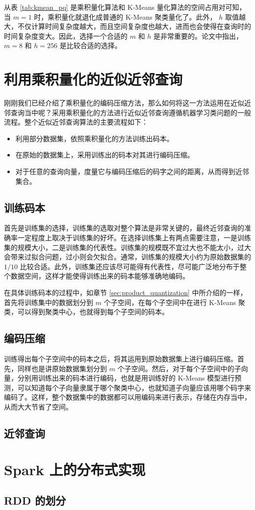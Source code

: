 从表 \ref{tab:kmean_pq} 是乘积量化算法和 K-Means 量化算法的空间占用对可知，当 $m = 1$ 时，乘积量化就退化成普通的 K-Means 聚类量化了。此外， $h$ 取值越大，不仅计算时间复杂度越大，而且空间复杂度也越大，进而也会使得在查询时的时间复杂度变大。因此，选择一个合适的 $m$ 和 $h$ 是非常重要的。论文\cite{Herve_PQ}中指出，$ m = 8 $ 和 $h = 256$ 是比较合适的选择。
\section{利用乘积量化的近似近邻查询}
刚刚我们已经介绍了乘积量化的编码压缩方法，那么如何将这一方法运用在近似近邻查询当中呢？采用乘积量化的方法进行近似近邻查询遵循机器学习类问题的一般流程。整个近似近邻查询算法的主要流程如下：
\begin{itemize}
\item 利用部分数据集，依照乘积量化的方法训练出码本。
\item 在原始的数据集上，采用训练出的码本对其进行编码压缩。
\item 对于任意的查询向量，度量它与编码压缩后的码字之间的距离，从而得到近邻集合。
\end{itemize}
\subsection{训练码本}
首先是训练集的选择，训练集的选取对整个算法是非常关键的，最终近邻查询的准确率一定程度上取决于训练集的好坏。在选择训练集上有两点需要注意，一是训练集的规模大小，二是训练集的代表性。训练集的规模既不宜过大也不能太小，过大会带来过拟合问题，过小则会欠拟合。通常，训练集的规模大小约为原始数据集的 $1/10$ 比较合适。此外，训练集还应该尽可能得有代表性，尽可能广泛地分布于整个数据空间，这样才能使得训练出来的码本能够准确地编码。

在具体训练码本的过程中，如章节 \ref{sec:product_quantization} 中所介绍的一样，首先将训练集中的数据划分到 $m$ 个子空间，在每个子空间中在进行 K-Means 聚类，可以得到聚类中心，也就得到每个子空间的码本。
\subsection{编码压缩}
训练得出每个子空间中的码本之后，将其运用到原始数据集上进行编码压缩。首先，同样也是讲原始数据集划分到 $m$ 个子空间。然后，对于每个子空间中的子向量，分别用训练出来的码本进行编码，也就是用训练好的 K-Means 模型进行预测，可以知道每个子向量隶属于哪个聚类中心，也就知道子向量应该用哪个码字来编码了。这样，整个数据集中的数据都可以用编码来进行表示，存储在内存当中，从而大大节省了空间。
\subsection{近邻查询}

\section{Spark 上的分布式实现}
\subsection{RDD 的划分}


